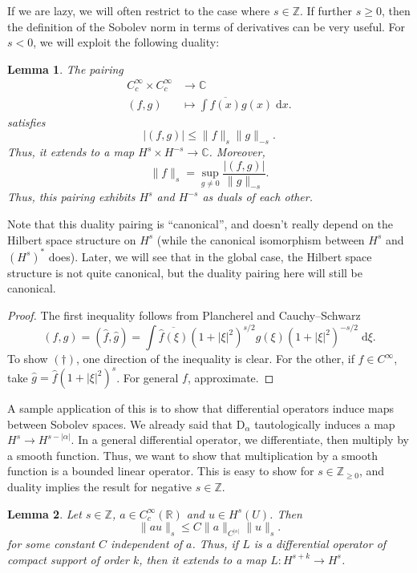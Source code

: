 \documentclass{shortart}
\newtheorem*{lemma}{Lemma}
\theoremstyle{definition}
\newcommand\R{\mathbb{R}}
\newcommand\Z{\mathbb{Z}}
\newcommand\C{\mathbb{C}}
\renewcommand\d{\mathrm{d}}
\newcommand\D{\mathrm{D}}
\begin{document}
If we are lazy, we will often restrict to the case where $s \in \Z$. If further $s \geq 0$, then the definition of the Sobolev norm in terms of derivatives can be very useful. For $s < 0$, we will exploit the following duality:
\begin{lemma}
  The pairing
  \begin{align*}
    C_c^\infty \times C_c^\infty &\to \C\\
    (f, g) &\mapsto \int \overline{f(x)} g(x) \;\d x.
  \end{align*}
  satisfies
  \[
    |(f, g)| \leq \|f\|_s \|g\|_{-s}.
  \]
  Thus, it extends to a map $H^s \times H^{-s} \to \C$. Moreover,
  \[
    \|f\|_s = \sup_{g \not= 0} \frac{|(f, g)|}{\|g\|_{-s}}.\tag{$\dagger$}
  \]
  Thus, this pairing exhibits $H^s$ and $H^{-s}$ as duals of each other.
\end{lemma}
Note that this duality pairing is ``canonical'', and doesn't really depend on the Hilbert space structure on $H^s$ (while the canonical isomorphism between $H^s$ and $(H^s)^*$ does). Later, we will see that in the global case, the Hilbert space structure is not quite canonical, but the duality pairing here will still be canonical.

\begin{proof}
  The first inequality follows from Plancherel and Cauchy--Schwarz
  \[
    (f, g) = (\hat{f}, \hat{g}) = \int \overline{\hat{f}(\xi)}(1 + |\xi|^2)^{s/2} \hat{g}(\xi) (1 + |\xi|^2)^{-s/2}\;\d \xi.
  \]
  To show $(\dagger)$, one direction of the inequality is clear. For the other, if $f \in C^\infty$, take $\hat{g} = \hat{f} (1 + |\xi|^2)^s$. For general $f$, approximate.
\end{proof}

A sample application of this is to show that differential operators induce maps between Sobolev spaces. We already said that $\D_\alpha$ tautologically induces a map $H^s \to H^{s - |\alpha|}$. In a general differential operator, we differentiate, then multiply by a smooth function. Thus, we want to show that multiplication by a smooth function is a bounded linear operator. This is easy to show for $s \in \Z_{\geq 0}$, and duality implies the result for negative $s \in \Z$.

\begin{lemma}
   Let $s \in \Z$, $a \in C_c^\infty(\R)$ and $u \in H^s(U)$. Then
  \[
    \|au\|_s \leq C\|a\|_{C^{|s|}} \|u\|_s.
  \]
  for some constant $C$ independent of $a$. Thus, if $L$ is a differential operator of compact support of order $k$, then it extends to a map $L: H^{s + k} \to H^s$.
\end{lemma}
\end{document}
